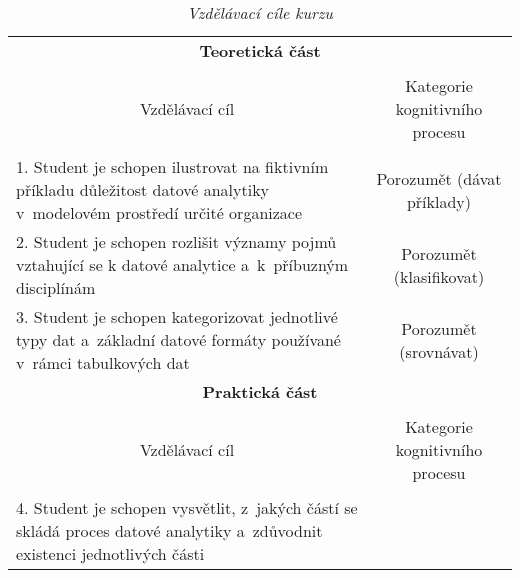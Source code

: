 

\begin{table}[htbp]

\caption{\textit{Vzdělávací cíle kurzu}}\label{tab8}

\footnotesize

{

\begin{tabularx}{\linewidth}{p{9cm}c}

\toprule

\multicolumn{2}{c}{\textbf{Teoretická část}}

\tabularnewline
\\

\multicolumn{1}{c}{Vzdělávací cíl} & Kategorie kognitivního procesu 

\tabularnewline
\\
\midrule

1. Student je schopen ilustrovat na fiktivním příkladu důležitost datové analytiky v~modelovém prostředí určité organizace\label{1-cil}

&

Porozumět (dávat příklady)

\\
\midrule

2. Student je schopen rozlišit významy pojmů vztahující se k datové analytice a~k~příbuzným disciplínám\label{2-cil}

&

Porozumět (klasifikovat)

\\

\midrule

3. Student je schopen kategorizovat jednotlivé typy dat a~základní datové formáty používané v~rámci tabulkových dat\label{3-cil}

&

Porozumět (srovnávat)

\\
\toprule

\multicolumn{2}{c}{\textbf{Praktická část}}

\\

\tabularnewline

\multicolumn{1}{c}{Vzdělávací cíl} & Kategorie kognitivního procesu 

\tabularnewline
\\
\midrule

4. Student je schopen vysvětlit, z~jakých částí se skládá proces datové analytiky a~zdůvodnit existenci jednotlivých části\label{4-cil}


\end{tabularx}}
\end{table}
